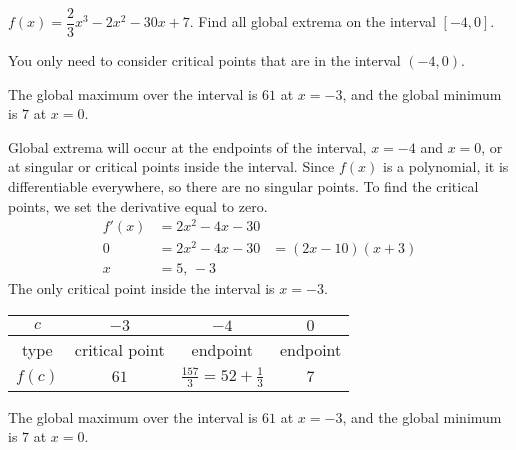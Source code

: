 \begin{Mquestion}
$f(x)=\dfrac{2}{3}x^3-2x^2-30x+7$.
Find all global extrema on the interval $[-4,0]$.
\end{Mquestion}
\begin{hint}
You only need to consider critical points that are in the interval $(-4,0).$
\end{hint}
\begin{answer}
The global maximum over the interval is $61$ at $x=-3$, and the global minimum is $7$ at $x=0$.
\end{answer}
\begin{solution}
Global extrema will occur at the endpoints of the interval, $x=-4$ and $x=0$, or at singular or critical points inside the interval. Since $f(x)$ is a polynomial, it is differentiable everywhere, so there are no singular points. To find the critical points, we set the derivative equal to zero.
\begin{align*}
f'(x)&=2x^2-4x-30\\
0&=2x^2-4x-30
&=(2x-10)(x+3)\\
x&=5,\,-3
\end{align*}
The only critical point inside the interval is $x=-3$.


\begin{center}
\begin{tabular}{|c||c|c|c|}
\hline
$c$ & $-3$ &  $-4$ &  $0$ \\
\hline
type & critical point & endpoint & endpoint  \\
\hline
$f(c)$ & $61$ & $\frac{157}{3}=52+\frac{1}{3}$ & $7$\\
\hline
\end{tabular}
\end{center}
The global maximum over the interval is $61$ at $x=-3$, and the global minimum is $7$ at $x=0$.
\end{solution}
